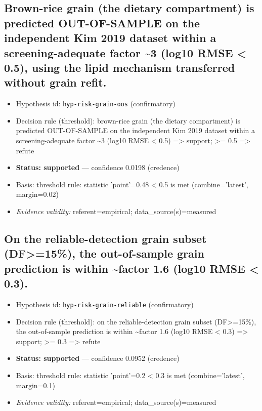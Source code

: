 \documentclass{article}
\begin{document}
\subsection{Brown-rice grain (the dietary compartment) is predicted OUT-OF-SAMPLE on the independent Kim 2019 dataset within a screening-adequate factor \textasciitilde{}3 (log10 RMSE < 0.5), using the lipid mechanism transferred without grain refit.}
\begin{itemize}
  \item Hypothesis id: \texttt{hyp-risk-grain-oos} (confirmatory)
  \item Decision rule (threshold): brown-rice grain (the dietary compartment) is predicted OUT-OF-SAMPLE on the independent Kim 2019 dataset within a screening-adequate factor \textasciitilde{}3 (log10 RMSE < 0.5) => support; >= 0.5 => refute
  \item \textbf{Status: supported} --- confidence 0.0198 (credence)
  \item Basis: threshold rule: statistic 'point'=0.48 < 0.5 is met (combine='latest', margin=0.02)
  \item \textit{Evidence validity:} referent=empirical; data\_source(s)=measured
\end{itemize}

\subsection{On the reliable-detection grain subset (DF>=15\%), the out-of-sample grain prediction is within \textasciitilde{}factor 1.6 (log10 RMSE < 0.3).}
\begin{itemize}
  \item Hypothesis id: \texttt{hyp-risk-grain-reliable} (confirmatory)
  \item Decision rule (threshold): on the reliable-detection grain subset (DF>=15\%), the out-of-sample prediction is within \textasciitilde{}factor 1.6 (log10 RMSE < 0.3) => support; >= 0.3 => refute
  \item \textbf{Status: supported} --- confidence 0.0952 (credence)
  \item Basis: threshold rule: statistic 'point'=0.2 < 0.3 is met (combine='latest', margin=0.1)
  \item \textit{Evidence validity:} referent=empirical; data\_source(s)=measured
\end{itemize}
\end{document}
